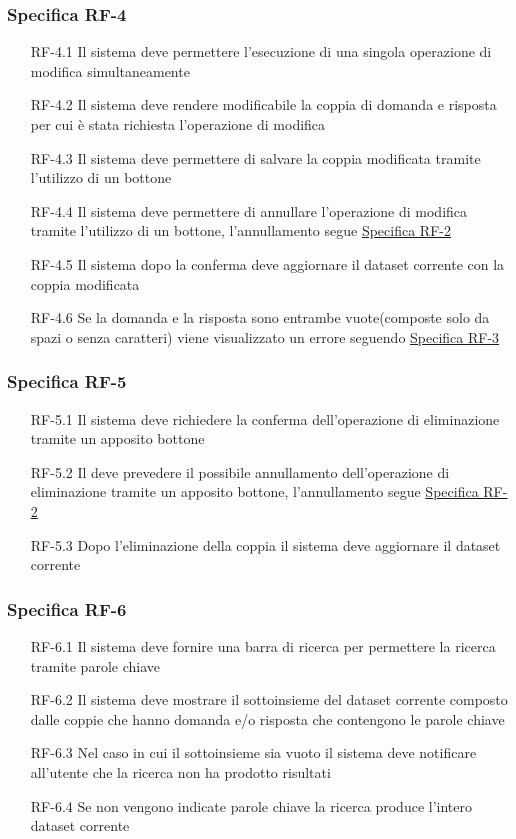 \subsubsection{Specifica RF-4}
\label{subsubsec:RF-4}
\begin{enumerate}
    \item[RF-4.1] Il sistema deve permettere l'esecuzione di una singola operazione di modifica simultaneamente
    \item[RF-4.2] Il sistema deve rendere modificabile la coppia di domanda e risposta per cui è stata richiesta l'operazione di modifica
    \item[RF-4.3] Il sistema deve permettere di salvare la coppia modificata tramite l'utilizzo di un bottone
    \item[RF-4.4] Il sistema deve permettere di annullare l'operazione di modifica tramite l'utilizzo di un bottone, l'annullamento segue \hyperref[subsubsec:RF-2]{Specifica RF-2}
    \item[RF-4.5] Il sistema dopo la conferma deve aggiornare il dataset corrente con la coppia modificata
    \item[RF-4.6] Se la domanda e la risposta sono entrambe vuote(composte solo da spazi o senza caratteri) viene visualizzato un errore seguendo \hyperref[subsubsec:RF-3]{Specifica RF-3}
\end{enumerate}

\subsubsection{Specifica RF-5}
\label{subsubsec:RF-5}
\begin{enumerate}
    \item[RF-5.1] Il sistema deve richiedere la conferma dell'operazione di eliminazione tramite un apposito bottone
    \item[RF-5.2] Il deve prevedere il possibile annullamento dell'operazione di eliminazione tramite un apposito bottone, l'annullamento segue \hyperref[subsubsec:RF-2]{Specifica RF-2}
    \item[RF-5.3] Dopo l'eliminazione della coppia il sistema deve aggiornare il dataset corrente
\end{enumerate}

\subsubsection{Specifica RF-6}
\label{subsubsec:RF-6}
\begin{enumerate}
    \item[RF-6.1] Il sistema deve fornire una barra di ricerca per permettere la ricerca tramite parole chiave 
    \item[RF-6.2] Il sistema deve mostrare il sottoinsieme del dataset corrente composto dalle coppie che hanno domanda e/o risposta che contengono le parole chiave
    \item[RF-6.3] Nel caso in cui il sottoinsieme sia vuoto il sistema deve notificare all'utente che la ricerca non ha prodotto risultati
    \item[RF-6.4] Se non vengono indicate parole chiave la ricerca produce l'intero dataset corrente
\end{enumerate}

